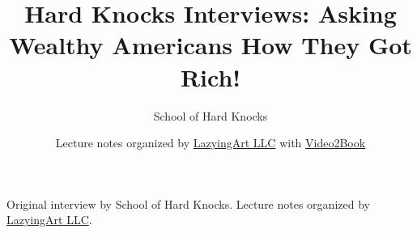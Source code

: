 \documentclass[11pt,oneside]{book}
\begin{document}
\frontmatter
\title{Hard Knocks Interviews: Asking Wealthy Americans How They Got Rich!}
\author{School of Hard Knocks}
\date{Lecture notes organized by \href{https://lazying.art}{LazyingArt LLC} with \href{https://github.com/lachlanchen/Video2Book}{Video2Book}}
\maketitle
\begin{center}
\small Original interview by School of Hard Knocks. Lecture notes organized by \href{https://lazying.art}{LazyingArt LLC}.
\end{center}
\clearpage
\mainmatter

\end{document}
